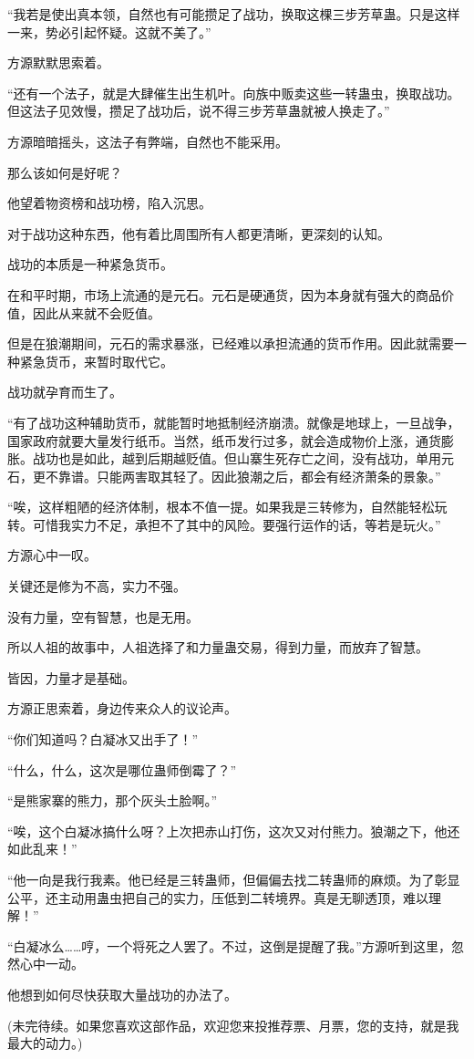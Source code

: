 \begin{this_body}
“我若是使出真本领，自然也有可能攒足了战功，换取这棵三步芳草蛊。只是这样一来，势必引起怀疑。这就不美了。”

方源默默思索着。

“还有一个法子，就是大肆催生出生机叶。向族中贩卖这些一转蛊虫，换取战功。但这法子见效慢，攒足了战功后，说不得三步芳草蛊就被人换走了。”

方源暗暗摇头，这法子有弊端，自然也不能采用。

那么该如何是好呢？

他望着物资榜和战功榜，陷入沉思。

对于战功这种东西，他有着比周围所有人都更清晰，更深刻的认知。

战功的本质是一种紧急货币。

在和平时期，市场上流通的是元石。元石是硬通货，因为本身就有强大的商品价值，因此从来就不会贬值。

但是在狼潮期间，元石的需求暴涨，已经难以承担流通的货币作用。因此就需要一种紧急货币，来暂时取代它。

战功就孕育而生了。

“有了战功这种辅助货币，就能暂时地抵制经济崩溃。就像是地球上，一旦战争，国家政府就要大量发行纸币。当然，纸币发行过多，就会造成物价上涨，通货膨胀。战功也是如此，越到后期越贬值。但山寨生死存亡之间，没有战功，单用元石，更不靠谱。只能两害取其轻了。因此狼潮之后，都会有经济萧条的景象。”

“唉，这样粗陋的经济体制，根本不值一提。如果我是三转修为，自然能轻松玩转。可惜我实力不足，承担不了其中的风险。要强行运作的话，等若是玩火。”

方源心中一叹。

关键还是修为不高，实力不强。

没有力量，空有智慧，也是无用。

所以人祖的故事中，人祖选择了和力量蛊交易，得到力量，而放弃了智慧。

皆因，力量才是基础。

方源正思索着，身边传来众人的议论声。

“你们知道吗？白凝冰又出手了！”

“什么，什么，这次是哪位蛊师倒霉了？”

“是熊家寨的熊力，那个灰头土脸啊。”

“唉，这个白凝冰搞什么呀？上次把赤山打伤，这次又对付熊力。狼潮之下，他还如此乱来！”

“他一向是我行我素。他已经是三转蛊师，但偏偏去找二转蛊师的麻烦。为了彰显公平，还主动用蛊虫把自己的实力，压低到二转境界。真是无聊透顶，难以理解！”

“白凝冰么……哼，一个将死之人罢了。不过，这倒是提醒了我。”方源听到这里，忽然心中一动。

他想到如何尽快获取大量战功的办法了。

(未完待续。如果您喜欢这部作品，欢迎您来投推荐票、月票，您的支持，就是我最大的动力。)

\end{this_body}

